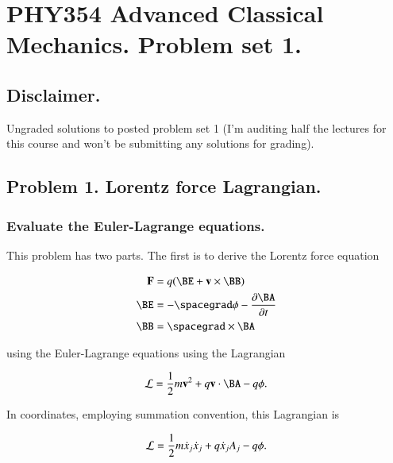 %
%

\chapter{PHY354 Advanced Classical Mechanics.  Problem set 1.}
\label{chap:classicalMechanicsPs1}
{}
\date{Jan 24, 2012}

\beginArtWithToc

\section{Disclaimer.}

Ungraded solutions to posted problem set 1 (I'm auditing half the lectures for this course and won't be submitting any solutions for grading).

\section{Problem 1.  Lorentz force Lagrangian.}
\subsection{Evaluate the Euler-Lagrange equations.}

This problem has two parts.   The first is to derive the Lorentz force equation

\begin{align}\label{eqn:classicalMechanicsPs1:20}
\BF &= q (\BE + \Bv \cross \BB) \\
\BE &= -\spacegrad \phi - \PD{t}{\BA} \\
\BB &= \spacegrad \cross \BA
\end{align}

using the Euler-Lagrange equations using the Lagrangian

\begin{equation}\label{eqn:classicalMechanicsPs1:40}
\LL = \inv{2} m \Bv^2 + q \Bv \cdot \BA - q \phi.
\end{equation}

In coordinates, employing summation convention, this Lagrangian is

\begin{equation}\label{eqn:classicalMechanicsPs1:60}
\mathcal{L} = \frac{1}{2} m \dot{x}_j \dot{x}_j + q \dot{x}_j A_j - q \phi.
\end{equation}


